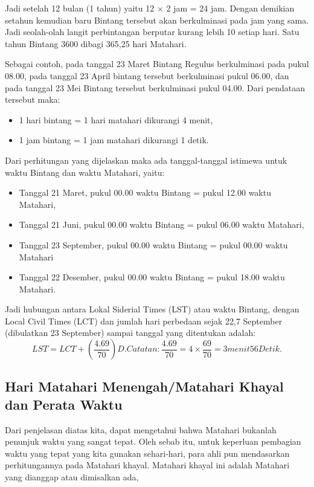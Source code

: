 Jadi setelah 12 bulan (1 tahun) yaitu  12 $\times$ 2 jam = 24 jam. Dengan demikian setahun
 kemudian baru Bintang tersebut akan berkulminasi pada jam yang sama. 
 Jadi seolah-olah langit perbintangan berputar kurang lebih 10 setiap hari. 
 Satu tahun Bintang 3600 dibagi 365,25 hari Matahari.

Sebagai contoh, pada tanggal 23 Maret Bintang Regulus berkulminasi pada pukul 08.00,
 pada tanggal 23 April bintang tersebut berkulminasi pukul 06.00, dan pada tanggal 23 Mei 
 Bintang tersebut berkulminasi pukul 04.00. Dari pendataan tersebut maka: 
\begin{itemize}
 \item 1 hari bintang = 1 hari matahari dikurangi 4 menit, 
 \item 1 jam bintang = 1 jam matahari dikurangi 1 detik. 
\end{itemize}
 Dari perhitungan yang dijelaskan maka ada tanggal-tanggal istimewa 
 untuk waktu Bintang dan waktu Matahari, yaitu:
 \begin{itemize}
	\item Tanggal 21 Maret, pukul 00.00 waktu Bintang = pukul 12.00 waktu Matahari,
	\item Tanggal 21 Juni, pukul 00.00 waktu Bintang = pukul 06.00 waktu Matahari,
	\item Tanggal 23 September, pukul 00.00 waktu Bintang = pukul 00.00 waktu Matahari
	\item Tanggal 22 Desember, pukul 00.00 waktu Bintang = pukul 18.00 waktu Matahari.
\end{itemize}
	

 Jadi hubungan antara Lokal Siderial Times (LST) atau waktu Bintang, 
 dengan Local Civil Times (LCT) dan jumlah hari perbedaan sejak 22,7 September 
 (dibulatkan 23 September) sampai tanggal yang ditentukan adalah:
\begin{equation}
 LST = LCT + (\frac{4.69}{70}) D. Catatan: \frac{4.69}{70} = 4 \times \frac{69}{70} = 3 menit 56 Detik.	
\end{equation}
\subsection{Hari Matahari Menengah/Matahari Khayal dan Perata Waktu}
 Dari penjelasan diatas kita, dapat mengetahui bahwa Matahari bukanlah penunjuk 
 waktu yang sangat tepat. Oleh sebab itu, untuk keperluan pembagian waktu yang tepat
 yang kita gunakan sehari-hari, para ahli pun mendasarkan perhitungannya pada Matahari
 khayal. Matahari khayal ini adalah Matahari yang dianggap atau dimisalkan ada, 

